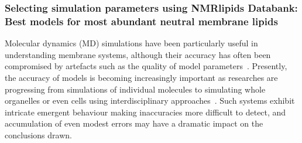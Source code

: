 \documentclass[fleqn,10pt]{wlscirep}
\begin{document}
\subsubsection{Selecting simulation parameters using NMRlipids Databank: Best models for most abundant neutral membrane lipids}
%
%
Molecular dynamics (MD) simulations have been particularly useful in understanding membrane systems, although their accuracy has often been compromised by artefacts such as the quality of model parameters~\cite{antila22b,gupta22}. Presently, the accuracy of models is becoming increasingly important as researches are progressing from simulations of individual molecules to simulating whole organelles or even cells using interdisciplinary approaches~\cite{johnson15,thornburg22,gupta22}. Such systems exhibit intricate emergent behaviour making inaccuracies more difficult to detect, and accumulation of even modest errors may have a dramatic impact on the conclusions drawn.
\end{document}
